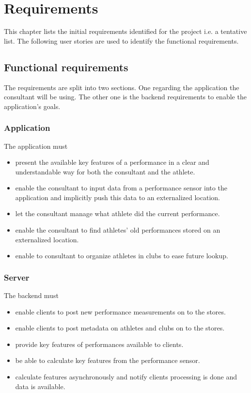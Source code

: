 \chapter{Requirements}
This chapter lists the initial requirements identified for the project i.e. a tentative list. The following user stories are used to identify the functional requirements.


\section*{Functional requirements}
The requirements are split into two sections. One regarding the application the consultant will be using. The other one is the backend requirements to enable the application's goals.

\subsection*{Application}
The application must
\begin{itemize}
	\item present the available key features of a performance in a clear and understandable way for both the consultant and the athlete.
	\item enable the consultant to input data from a performance sensor into the application and implicitly push this data to an externalized location.
	\item let the consultant manage what athlete did the current performance.
	\item enable the consultant to find athletes' old performances stored on an externalized location.
	\item enable to consultant to organize athletes in clubs to ease future lookup.
\end{itemize}

\subsection*{Server}
The backend must
\begin{itemize}
	\item enable clients to post new performance measurements on to the stores.
	\item enable clients to post metadata on athletes and clubs on to the stores.
	\item provide key features of performances available to clients.
	\item be able to calculate key features from the performance sensor.
	\item calculate features asynchronously and notify clients processing is done and data is available.
\end{itemize}

